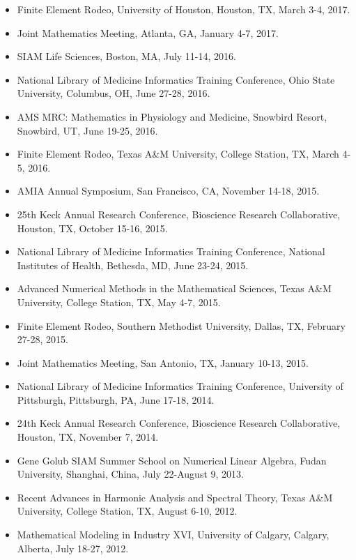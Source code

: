 \documentclass{article} %
\begin{document}
\begin{itemize}
\item Finite Element Rodeo, University of Houston, Houston, TX, March 3-4, 2017.
\item Joint Mathematics Meeting, Atlanta, GA, January 4-7, 2017.
\item SIAM Life Sciences, Boston, MA, July 11-14, 2016.
\item National Library of Medicine Informatics Training Conference, Ohio State University, Columbus, OH, June 27-28, 2016.
\item AMS MRC: Mathematics in Physiology and Medicine, Snowbird Resort, Snowbird, UT, June 19-25, 2016.
\item Finite Element Rodeo, Texas A\&M University, College Station, TX, March 4-5, 2016.
\item AMIA Annual Symposium, San Francisco, CA, November 14-18, 2015.
\item 25th Keck Annual Research Conference, Bioscience Research Collaborative, Houston, TX, October 15-16, 2015.
\item National Library of Medicine Informatics Training Conference, National Institutes of Health, Bethesda, MD, June 23-24, 2015.
\item Advanced Numerical Methods in the Mathematical Sciences, Texas A\&M University, College Station, TX, May 4-7, 2015.
\item Finite Element Rodeo, Southern Methodist University, Dallas, TX,
 February 27-28, 2015.
\item Joint Mathematics Meeting, San Antonio, TX, January 10-13, 2015. 
\item National Library of Medicine Informatics Training Conference, University of Pittsburgh, Pittsburgh, PA, June 17-18, 2014.
\item 24th Keck Annual Research Conference, Bioscience Research Collaborative, Houston, TX, November 7, 2014.
\item Gene Golub SIAM Summer School on Numerical Linear Algebra, Fudan University, Shanghai, China, July 22-August 9, 2013.
\item Recent Advances in Harmonic Analysis and Spectral Theory, Texas A\&M University, College Station, TX, August 6-10, 2012.
\item Mathematical Modeling in Industry XVI, University of Calgary, Calgary, Alberta, July 18-27, 2012.
\end{itemize}







\end{document}
